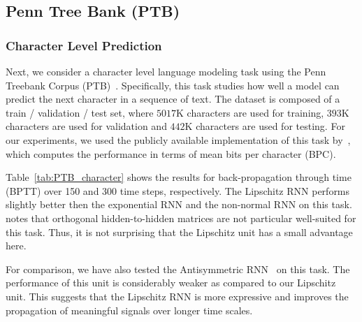 \documentclass{article} \usepackage{iclr2021_conference,times}
\begin{document}
\subsection{Penn Tree Bank (PTB)}

\subsubsection{Character Level Prediction}\label{sec:ptb_character}

Next, we consider a character level language modeling task using the Penn Treebank Corpus (PTB)~\citep{marcus1993building}. Specifically, this task studies how well a model can predict the next character in a sequence of text.
The dataset is composed of a train / validation / test set, where $5017$K characters are used for training, $393$K characters are used for validation and $442$K characters are used for testing.  
For our experiments, we used the publicly available implementation of this task by~\citet{kerg2019non}, which computes the performance in terms of mean bits per character (BPC).

Table~\ref{tab:PTB_character} shows the results for back-propagation through time (BPTT) over 150 and 300 time steps, respectively. The Lipschitz RNN performs slightly better then the exponential RNN and the non-normal RNN on this task. \citep{kerg2019non} notes that orthogonal hidden-to-hidden matrices are not particular well-suited for this task. Thus, it is not surprising that the Lipschitz unit has a small advantage here. 

For comparison, we have also tested the Antisymmetric RNN~\citep{chang2018antisymmetricrnn} on this task. The performance of this unit is considerably weaker as compared to our Lipschitz unit. 
This suggests that the Lipschitz RNN is more expressive and improves the propagation of meaningful signals over longer time scales.
\end{document}
